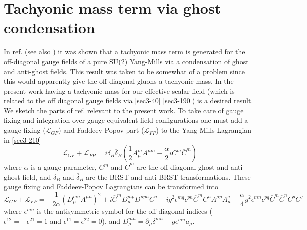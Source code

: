 \documentclass[a4paper,aps,showpacs]{revtex4}
\begin{document}
\section{Tachyonic mass term via ghost condensation}

In ref. \cite{dudal} (see also \cite{lemes}) it was shown that a tachyonic mass term is 
generated for the off-diagonal gauge fields of a pure SU(2) Yang-Mills via a condensation of
ghost and anti-ghost fields. This result was taken to be somewhat of a problem
since this would apparently give the off diagonal gluons a tachyonic mass.
In the present work having a tachyonic mass for our effective scalar field
(which is related to the off diagonal gauge fields via \eqref{sec3-40} 
\eqref{sec3-190}) is a desired result.
We sketch the parts of ref. \cite{dudal} relevant to the present
work. To take care of gauge fixing and integration over gauge equivalent 
field configurations one must add a gauge fixing (${\mathcal L} _{GF}$) and  
Faddeev-Popov part (${\mathcal L} _{FP}$) to the Yang-Mills Lagrangian in
\eqref{sec3-210}
\begin{equation}
\label{sec4-10}
{\mathcal L}_{GF} + {\mathcal L}_{FP} = i \delta _B {\overline{ \delta}}_B \left(
\frac{1}{2} A_{\mu} ^m A^{\mu m} - \frac{\alpha}{2} i C^m {\overline{ C}}^m \right)
\end{equation}
where $\alpha$ is a gauge parameter, $C^m$ and ${\overline{ C}}^m$ are the off diagonal ghost and
anti-ghost field, and $\delta _B$ and ${\overline {\delta}}_B$ are the BRST and anti-BRST
transformations. These gauge fixing and Faddeev-Popov Lagrangians can be
transformed into
\begin{equation}
\label{sec4-20}
{\mathcal L}_{GF} + {\mathcal L}_{FP} = -\frac{1}{2 \alpha} (D_{\mu} ^{mn} A^{\mu n} )^2
+ i {\overline{ C}}^m D^{mp} _{\mu} D^{\mu pn} C^n - ig^2 \epsilon ^{mq} \epsilon ^{pn} {\overline{ C}}^m C^n A^{\mu p}
A_{\mu} ^q + \frac{\alpha}{4} g^2 \epsilon ^{mn} \epsilon ^{pq} {\overline{ C}}^m {\overline{ C}}^n C^p C^q
\end{equation}
where $\epsilon ^{mn}$ is the antisymmetric symbol for the off-diagonal indices ($\epsilon ^{12} =
-\epsilon ^{21} =1$ and $\epsilon ^{11}=\epsilon ^{22}=0$), and $D_{\mu} ^{mn} =
\partial _{\mu} \delta ^{mn} - g \epsilon ^{mn} a_{\mu}$.
\end{document}
